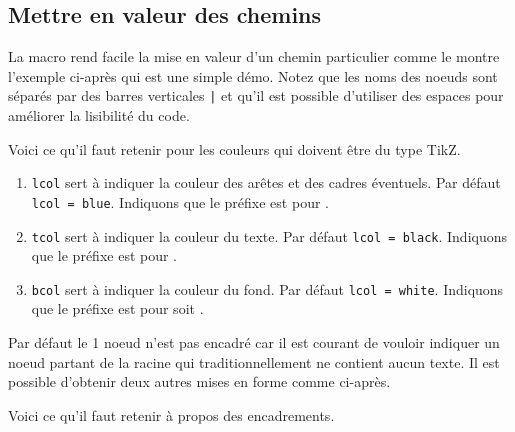 \documentclass[12pt,a4paper]{article}
\begin{document}

\subsection{Mettre en valeur des chemins}


La macro  rend facile la mise en valeur d'un chemin particulier comme le montre l'exemple ci-après qui est une simple démo.
Notez que les noms des noeuds sont séparés par des barres verticales \verb#|# et  qu'il est possible d'utiliser des espaces pour améliorer la lisibilité du code. 



Voici ce qu'il faut retenir pour les couleurs qui doivent être du type TikZ.

\begin{enumerate}
	\item \verb#lcol# sert à indiquer la couleur des arêtes et des cadres éventuels.
	      Par défaut \verb#lcol = blue#.
	      Indiquons que le préfixe  est pour .

	\item \verb#tcol# sert à indiquer la couleur du texte.
	      Par défaut \verb#lcol = black#.
	      Indiquons que le préfixe  est pour .

	\item \verb#bcol# sert à indiquer la couleur du fond.
	      Par défaut \verb#lcol = white#.
	      Indiquons que le préfixe  est pour  soit . 
\end{enumerate}





Par défaut le 1\ier{} noeud n'est pas encadré car il est courant de vouloir indiquer un noeud partant de la racine qui traditionnellement ne contient aucun texte.
Il est possible d'obtenir deux autres mises en forme comme ci-après.


Voici ce qu'il faut retenir à propos des encadrements.
\end{document}
